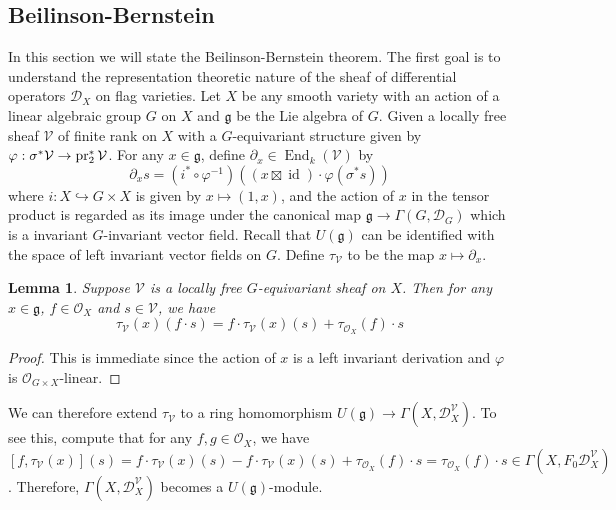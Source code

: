 \documentclass[11pt, a4paper]{article}
\newtheorem{lemma}[theorem]{Lemma}
\theoremstyle{definition}
\newcommand{\s}[0]{\sigma}
\newcommand{\End}[0]{\operatorname{End}}
\newcommand{\id}[0]{\operatorname{id}}
\newcommand{\g}{\mathfrak g}
\begin{document}
    \subsection{Beilinson-Bernstein}
    In this section we will state the Beilinson-Bernstein theorem. The first goal is to understand the representation theoretic nature of the sheaf of differential operators $\mathcal D_X$ on flag varieties. Let $X$ be any smooth variety with an action of a linear algebraic group $G$ on $X$ and $\g$ be the Lie algebra of $G$. Given a locally free sheaf $\mathcal V$ of finite rank on $X$ with a $G$-equivariant structure given by $\varphi:\s^*\mathcal V\to\pr_2^*\mathcal V$. For any $x\in\g$, define $\partial_x\in\End_k(\mathcal V)$ by
    \[\partial_xs=(i^*\circ\varphi^{-1})((x\boxtimes \id)\cdot\varphi(\s^*s))\]
    where $i:X\hookrightarrow G\times X$ is given by $x\mapsto(1, x)$, and the action of $x$ in the tensor product is regarded as its image under the canonical map $\g\to\Gamma(G, \mathcal D_G)$ which is a invariant $G$-invariant vector field. Recall that $U(\g)$ can be identified with the space of left invariant vector fields on $G$. Define $\tau_{\mathcal V}$ to be the map $x\mapsto\partial_x$.
    \begin{lemma}
        Suppose $\mathcal V$ is a locally free $G$-equivariant sheaf on $X$. Then for any $x\in \g$, $f\in\mathcal O_X$ and $s\in \mathcal V$, we have
        \[\tau_{\mathcal V}(x)(f\cdot s)=f\cdot \tau_{\mathcal V}(x)(s)+\tau_{\mathcal O_X}(f)\cdot s\] 
    \end{lemma}
    \begin{proof}
        This is immediate since the action of $x$ is a left invariant derivation and $\varphi$ is $\mathcal O_{G\times X}$-linear.
    \end{proof}
    We can therefore extend $\tau_{\mathcal V}$ to a ring homomorphism $U(\g)\to \Gamma(X, \mathcal D_X^{\mathcal V})$. To see this, compute that for any $f, g\in \mathcal O_X$, we have $[f, \tau_{\mathcal V}(x)](s)=f\cdot \tau_{\mathcal V}(x)(s)-f\cdot \tau_{\mathcal V}(x)(s)+\tau_{\mathcal O_X}(f)\cdot s=\tau_{\mathcal O_X}(f)\cdot s\in\Gamma(X, F_0\mathcal D_X^{\mathcal V})$. Therefore, $\Gamma(X, \mathcal D_X^{\mathcal V})$ becomes a $U(\g)$-module.
\end{document}
